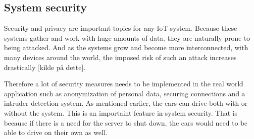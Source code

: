 \subsection{System security}
Security and privacy are important topics for any IoT-system. Because these systems gather and work with huge amounts of data, they are naturally prone to being attacked. And as the systems grow and become more interconnected, with many devices around the world, the imposed risk of such an attack increases drastically [kilde på dette].

Therefore a lot of security measures needs to be implemented in the real world application such as anonymization of personal data, securing connections and a intruder detection system. As mentioned earlier, the cars can drive both with or without the system. This is an importaint feature in system security. That is because if there is a need for the server to shut down, the cars would need to be able to drive on their own as well.